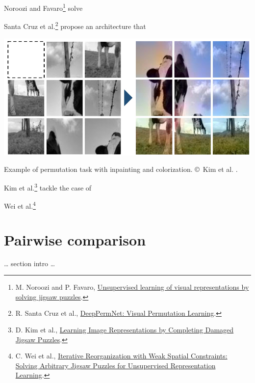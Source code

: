 \begin{description}
    \item Noroozi and Favaro\footnote{\citep{noroozi2016unsupervised} M. Noroozi and P. Favaro, \href{https://arxiv.org/pdf/1603.09246.pdf}{Unsupervised learning of visual representations by solving jigsaw puzzles}.} solve \blindtext

    \item Santa Cruz et al.\footnote{\citep{santa2017deeppermnet} R. Santa Cruz et al., \href{https://arxiv.org/pdf/1704.02729.pdf}{DeepPermNet: Visual Permutation Learning}.} propose an architecture that \blindtext

\begin{marginfigure}
    \centering
    \includegraphics[width=\linewidth]{30-part1/img/kim.jpg}
    \caption[A complex permutation task]{Example of permutation task with inpainting and colorization. ©~Kim et al. \citep{kim2018learning}.}
    \label{fig:soadz:kim}
\end{marginfigure}

    \item Kim et al.\footnote[][1em]{\citep{kim2018learning} D. Kim et al., \href{https://arxiv.org/pdf/1802.01880.pdf}{Learning Image Representations by Completing Damaged Jigsaw Puzzles}.} tackle the case of \blindtext

    \item Wei et al.\footnote{\citep{wei2019iterative} C. Wei et al., \href{https://arxiv.org/pdf/1812.00329.pdf}{Iterative Reorganization with Weak Spatial Constraints: Solving Arbitrary Jigsaw Puzzles for Unsupervised Representation Learning}.} \blindtext
\end{description}


\section{Pairwise comparison}
\label{sec:sota1:pc}

… section intro …